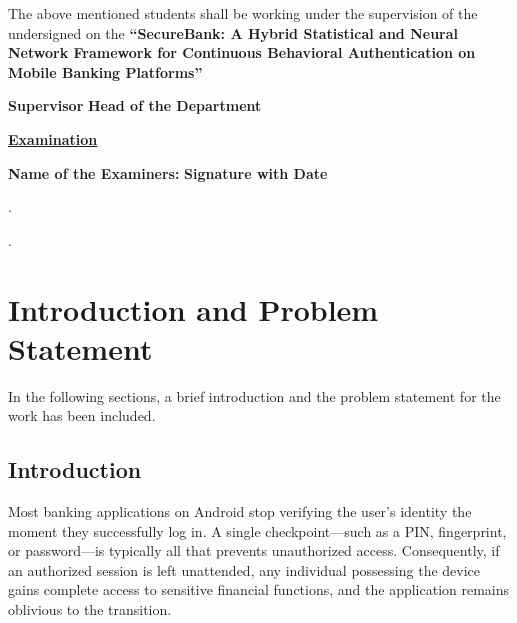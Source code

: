 \documentclass[12pt,a4paper]{report}
\begin{document}
\vspace{1.0cm}
\begin{center}
The above mentioned students shall be working under the supervision of the undersigned on the \textbf{``SecureBank: A Hybrid Statistical and Neural Network Framework for Continuous Behavioral Authentication on Mobile Banking Platforms''}
\end{center}

\vspace{1.5cm}
\noindent \textbf{Supervisor} \hfill \textbf{Head of the Department}

\vspace{1.5cm}
\begin{center}
\textbf{\underline{Examination}}
\end{center}

\vspace{1.0cm}
\noindent \textbf{Name of the Examiners:} \hfill \textbf{Signature with Date}

\vspace{0.5cm}
. 

\vspace{0.5cm}
.
\newpage

\renewcommand{\contentsname}{\begin{center}\textbf{\Large Table of Contents}\end{center}\vspace{-1cm}}
\tableofcontents
\newpage


\chapter{Introduction and Problem Statement}

In the following sections, a brief introduction and the problem statement for the work has been included.

\section{Introduction}

Most banking applications on Android stop verifying the user's identity the moment they successfully log in. A single checkpoint---such as a PIN, fingerprint, or password---is typically all that prevents unauthorized access. Consequently, if an authorized session is left unattended, any individual possessing the device gains complete access to sensitive financial functions, and the application remains oblivious to the transition.
\end{document}
